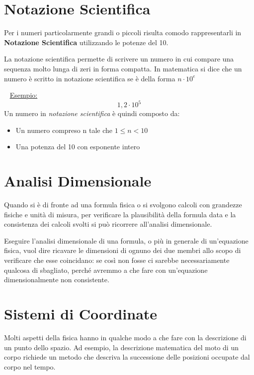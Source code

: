 \documentclass[a4paper,11pt,oneside]{book}
\begin{document}
\section{Notazione Scientifica}
Per i numeri particolarmente grandi o piccoli risulta comodo rappresentarli
in \textbf{Notazione Scientifica} utilizzando le potenze del 10.

La notazione scientifica permette di scrivere un numero in cui compare una sequenza molto lunga di zeri in forma compatta.
In matematica si dice che un numero è scritto in notazione scientifica se è della forma $n\cdot10^e$

~\newline
\underline{Esempio:}
\begin{equation*}
    1,2 \cdot 10^5
\end{equation*}
Un numero in \emph{notazione scientifica} è quindi composto da:
\begin{itemize}
    \item Un numero compreso n tale che $1 \leq n < 10$
    \item Una potenza del 10 con esponente intero
\end{itemize}

\newpage
\section{Analisi Dimensionale}
Quando si è di fronte ad una formula fisica o si svolgono calcoli con grandezze fisiche e unità di misura,
per verificare la plausibilità della formula data e la consistenza
dei calcoli svolti si può ricorrere all'analisi dimensionale.

Eseguire l'analisi dimensionale di una formula, o più in generale di un'equazione fisica,
vuol dire ricavare le dimensioni di ognuno dei due membri allo scopo di verificare che esse coincidano:
se così non fosse ci sarebbe necessariamente qualcosa di sbagliato, perché avremmo a che fare con un'equazione
dimensionalmente non consistente.


\section{Sistemi di Coordinate}
Molti aspetti della fisica hanno in qualche modo a che fare con la descrizione di un punto dello spazio.
Ad esempio, la descrizione matematica del moto di un corpo richiede un metodo che descriva la successione
delle posizioni occupate dal corpo nel tempo.
\end{document}
